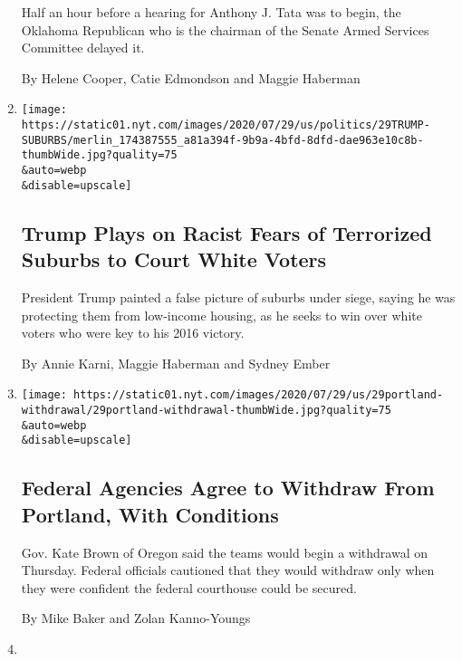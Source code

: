 \begin{enumerate}
  Half an hour before a hearing for Anthony J. Tata was to begin, the
  Oklahoma Republican who is the chairman of the Senate Armed Services
  Committee delayed it.

  By Helene Cooper, Catie Edmondson and Maggie Haberman
\item
  \href{/2020/07/29/us/politics/trump-suburbs-housing-white-voters.html}{}

  \texttt{[image: https://static01.nyt.com/images/2020/07/29/us/politics/29TRUMP-SUBURBS/merlin\_174387555\_a81a394f-9b9a-4bfd-8dfd-dae963e10c8b-thumbWide.jpg?quality=75\\\&auto=webp\\\&disable=upscale]}

  \hypertarget{trump-plays-on-racist-fears-of-terrorized-suburbs-to-court-white-voters}{%
  \subsection{Trump Plays on Racist Fears of Terrorized Suburbs to Court
  White
  Voters}\label{trump-plays-on-racist-fears-of-terrorized-suburbs-to-court-white-voters}}

  President Trump painted a false picture of suburbs under siege, saying
  he was protecting them from low-income housing, as he seeks to win
  over white voters who were key to his 2016 victory.

  By Annie Karni, Maggie Haberman and Sydney Ember
\item
  \href{/2020/07/29/us/protests-portland-federal-withdrawal.html}{}

  \texttt{[image: https://static01.nyt.com/images/2020/07/29/us/29portland-withdrawal/29portland-withdrawal-thumbWide.jpg?quality=75\\\&auto=webp\\\&disable=upscale]}

  \hypertarget{federal-agencies-agree-to-withdraw-from-portland-with-conditions}{%
  \subsection{Federal Agencies Agree to Withdraw From Portland, With
  Conditions}\label{federal-agencies-agree-to-withdraw-from-portland-with-conditions}}

  Gov. Kate Brown of Oregon said the teams would begin a withdrawal on
  Thursday. Federal officials cautioned that they would withdraw only
  when they were confident the federal courthouse could be secured.

  By Mike Baker and Zolan Kanno-Youngs
\item
  \href{/2020/07/24/world/europe/woody-johnson-trump.html}{}


\end{enumerate}
